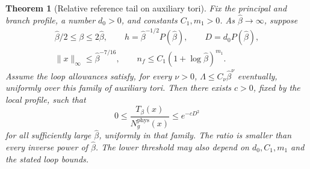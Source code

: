 \documentclass[11pt,reqno]{amsart}
\numberwithin{equation}{section}
\newtheorem{theorem}{Theorem}[section]
\theoremstyle{definition}
\theoremstyle{remark}
\begin{document}
\begin{theorem}[Relative reference tail on auxiliary tori]
\label{thm:tail-auxiliary}
Fix the principal and branch profile, a number \(d_0>0\),
and constants \(C_1,m_1>0\). As \(\widehat\beta\to\infty\),
suppose
\begin{equation}
 \begin{gathered}
       \widehat\beta/2\le\beta\le2\widehat\beta,\qquad
       h=\widehat\beta^{-1/2}P(\widehat\beta),\qquad
       D=d_0P(\widehat\beta),\\
       \|x\|_\infty\le\widehat\beta^{-7/16},\qquad
       n_f\le C_1(1+\log\widehat\beta)^{m_1}.
 \end{gathered}
 \label{eq:tail-auxiliary-regime}
\end{equation}
Assume the loop allowances satisfy, for every \(\nu>0\),
\(\Lambda\le C_\nu\widehat\beta^\nu\) eventually,
uniformly over this family of auxiliary tori. Then there
exists \(c>0\), fixed by the local profile, such that
\begin{equation}
                0\le\frac{T_\beta(x)}{N_g^{\mathrm{phys}}(x)}
                                      \le e^{-cD^2}
 \label{eq:tail-auxiliary-result}
\end{equation}
for all sufficiently large \(\widehat\beta\), uniformly
in that family. The ratio is smaller than every inverse
power of \(\widehat\beta\).
The lower threshold may also depend on
\(d_0,C_1,m_1\) and the stated loop bounds.
\end{theorem}
\end{document}
